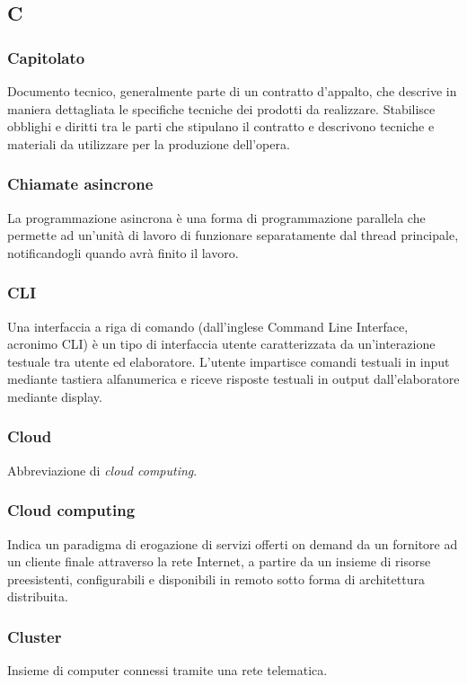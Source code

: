 \subsection*{\textbf{\hfill \Huge{C} \hfill}} 
\subsubsection*{Capitolato}
Documento tecnico, generalmente parte di un contratto d’appalto, che descrive in maniera dettagliata le specifiche tecniche dei prodotti da realizzare. Stabilisce obblighi e diritti tra le parti che stipulano il contratto e descrivono tecniche e materiali da utilizzare per la produzione dell’opera.
\subsubsection*{Chiamate asincrone}
La programmazione asincrona è una forma di programmazione parallela che permette ad un’unità di lavoro di funzionare separatamente dal thread principale, notificandogli quando avrà finito il lavoro.
\subsubsection*{CLI}
Una interfaccia a riga di comando (dall’inglese Command Line Interface, acronimo CLI) è un tipo di interfaccia utente caratterizzata da un’interazione testuale tra utente ed elaboratore. L’utente impartisce comandi testuali in input mediante tastiera alfanumerica e riceve risposte testuali in output dall’elaboratore mediante display.
\subsubsection*{Cloud}
Abbreviazione di \textit{cloud computing}\glos .
\subsubsection*{Cloud computing}
Indica un paradigma di erogazione di servizi offerti on demand da un fornitore ad un cliente finale attraverso la rete Internet, a partire da un insieme di risorse preesistenti, configurabili e disponibili in remoto sotto forma di architettura distribuita.
\subsubsection*{Cluster}
Insieme di computer connessi tramite una rete telematica.
